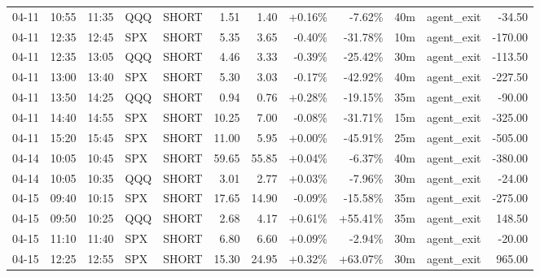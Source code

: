 \documentclass[11pt,a4paper,twoside]{article}
\begin{document}
\begin{center}
\begin{longtable}{>{\color{txtmain}}l l l l l r r r r r >{\color{txtmain}}l r}
04-11 & 10:55 & 11:35 & QQQ & SHORT & 1.51 & 1.40 & \textcolor{wingreen}{+0.16\%} & \textcolor{lossred}{-7.62\%} & 40m & agent\_exit & \textcolor{lossred}{-34.50} \\
04-11 & 12:35 & 12:45 & SPX & SHORT & 5.35 & 3.65 & \textcolor{lossred}{-0.40\%} & \textcolor{lossred}{-31.78\%} & 10m & agent\_exit & \textcolor{lossred}{-170.00} \\
04-11 & 12:35 & 13:05 & QQQ & SHORT & 4.46 & 3.33 & \textcolor{lossred}{-0.39\%} & \textcolor{lossred}{-25.42\%} & 30m & agent\_exit & \textcolor{lossred}{-113.50} \\
04-11 & 13:00 & 13:40 & SPX & SHORT & 5.30 & 3.03 & \textcolor{lossred}{-0.17\%} & \textcolor{lossred}{-42.92\%} & 40m & agent\_exit & \textcolor{lossred}{-227.50} \\
04-11 & 13:50 & 14:25 & QQQ & SHORT & 0.94 & 0.76 & \textcolor{wingreen}{+0.28\%} & \textcolor{lossred}{-19.15\%} & 35m & agent\_exit & \textcolor{lossred}{-90.00} \\
04-11 & 14:40 & 14:55 & SPX & SHORT & 10.25 & 7.00 & \textcolor{lossred}{-0.08\%} & \textcolor{lossred}{-31.71\%} & 15m & agent\_exit & \textcolor{lossred}{-325.00} \\
04-11 & 15:20 & 15:45 & SPX & SHORT & 11.00 & 5.95 & \textcolor{wingreen}{+0.00\%} & \textcolor{lossred}{-45.91\%} & 25m & agent\_exit & \textcolor{lossred}{-505.00} \\
04-14 & 10:05 & 10:45 & SPX & SHORT & 59.65 & 55.85 & \textcolor{wingreen}{+0.04\%} & \textcolor{lossred}{-6.37\%} & 40m & agent\_exit & \textcolor{lossred}{-380.00} \\
04-14 & 10:05 & 10:35 & QQQ & SHORT & 3.01 & 2.77 & \textcolor{wingreen}{+0.03\%} & \textcolor{lossred}{-7.96\%} & 30m & agent\_exit & \textcolor{lossred}{-24.00} \\
04-15 & 09:40 & 10:15 & SPX & SHORT & 17.65 & 14.90 & \textcolor{lossred}{-0.09\%} & \textcolor{lossred}{-15.58\%} & 35m & agent\_exit & \textcolor{lossred}{-275.00} \\
04-15 & 09:50 & 10:25 & QQQ & SHORT & 2.68 & 4.17 & \textcolor{wingreen}{+0.61\%} & \textcolor{wingreen}{+55.41\%} & 35m & agent\_exit & \textcolor{wingreen}{148.50} \\
04-15 & 11:10 & 11:40 & SPX & SHORT & 6.80 & 6.60 & \textcolor{wingreen}{+0.09\%} & \textcolor{lossred}{-2.94\%} & 30m & agent\_exit & \textcolor{lossred}{-20.00} \\
04-15 & 12:25 & 12:55 & SPX & SHORT & 15.30 & 24.95 & \textcolor{wingreen}{+0.32\%} & \textcolor{wingreen}{+63.07\%} & 30m & agent\_exit & \textcolor{wingreen}{965.00} \\

\end{longtable}
\end{center}
\end{document}
